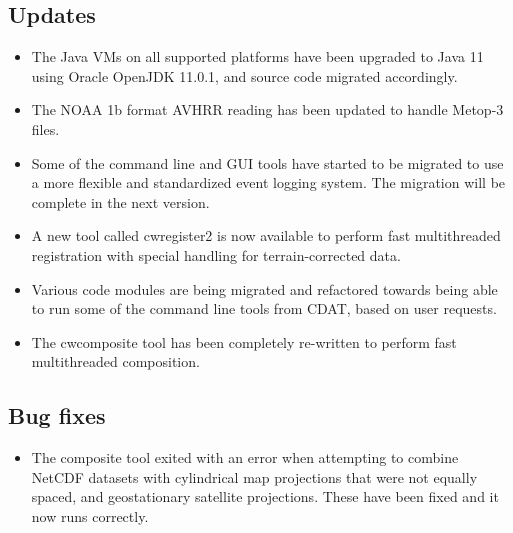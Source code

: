\subsection*{ Updates}

\begin{itemize}

  \item The Java VMs on all supported platforms have been upgraded to Java 11
  using Oracle OpenJDK 11.0.1, and source code migrated accordingly.

  \item The NOAA 1b format AVHRR reading has been updated to handle Metop-3
  files.

  \item Some of the command line and GUI tools have started to be migrated to
  use a more flexible and standardized event logging system.  The migration
  will be complete in the next version.

  \item A new tool called cwregister2 is now available to perform fast
  multithreaded registration with special handling for terrain-corrected data.

  \item Various code modules are being migrated and refactored towards
  being able to run some of the command line tools from CDAT, based on
  user requests.

  \item The cwcomposite tool has been completely re-written to perform fast
  multithreaded composition.

\end{itemize}

\subsection*{ Bug fixes}
\begin{itemize}

  \item The composite tool exited with an error when attempting to combine
  NetCDF datasets with cylindrical map projections that were not equally
  spaced, and geostationary satellite projections.  These have been fixed and
  it now runs correctly.

\end{itemize}


